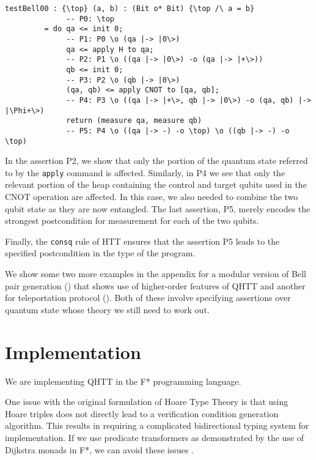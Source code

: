 \documentclass[acmsmall,nonacm,timestamp,review=false,anonymous=false]{acmart}
\begin{document}
\begin{lstlisting}[language=QHaskell]
testBell00 : {\top} (a, b) : (Bit o* Bit) {\top /\ a = b}
              -- P0: \top
         = do qa <= init 0;
              -- P1: P0 \o (qa |-> |0\>)
              qa <= apply H to qa;
              -- P2: P1 \o ((qa |-> |0\>) -o (qa |-> |+\>))
              qb <= init 0;
              -- P3: P2 \o (qb |-> |0\>)
              (qa, qb) <= apply CNOT to [qa, qb];
              -- P4: P3 \o ((qa |-> |+\>, qb |-> |0\>) -o (qa, qb) |-> |\Phi+\>)
              return (measure qa, measure qb)
              -- P5: P4 \o ((qa |-> -) -o \top) \o ((qb |-> -) -o \top)
\end{lstlisting}

In the assertion P2, we show that only the portion of the quantum state referred to by the \texttt{apply} command is affected. Similarly, in P4 we see that only the relevant portion of the heap containing the control and target qubits used in the CNOT operation are affected. In this case, we also needed to combine the two qubit state as they are now entangled. The last assertion, P5, merely encodes the strongest postcondition for measurement for each of the two qubits.

Finally, the \texttt{consq} rule of HTT ensures that the assertion P5 leads to the specified postcondition in the type of the program.

We show some two more examples in the appendix for a modular version of Bell pair generation () that shows use of higher-order features of QHTT and another for teleportation protocol (). Both of these involve specifying assertions over quantum state whose theory we still need to work out.


\section{Implementation}
We are implementing QHTT in the F* programming language.

One issue with the original formulation of Hoare Type Theory is that using Hoare triples does not directly lead to a verification condition generation algorithm. This results in requiring a complicated bidirectional typing system for implementation. If we use predicate transformers as demonstrated by the use of Dijkstra monads in F*, we can avoid these issues \cite{swamy2013verifying}.
\end{document}
